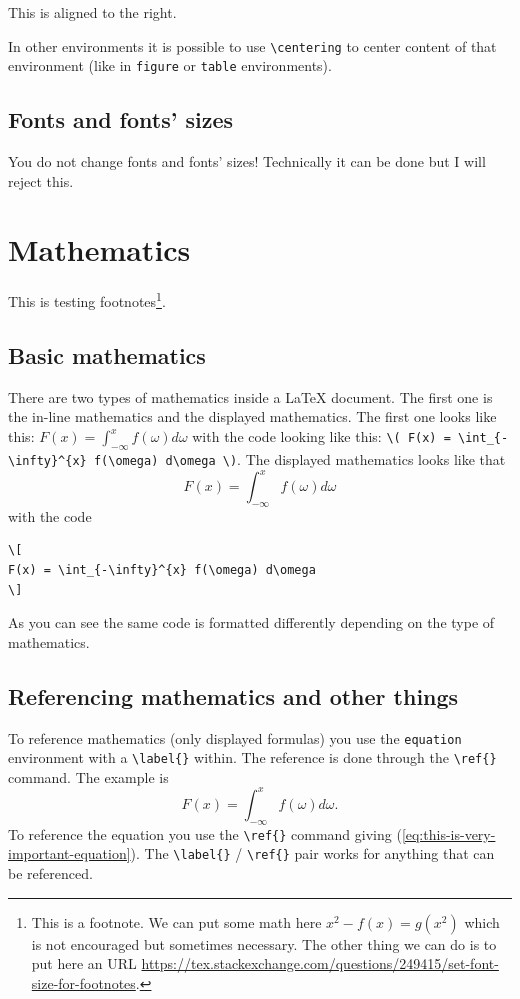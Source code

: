 \documentclass[english, twoside, 12pt, a4paper]{article}
\theoremstyle{definition}
\theoremstyle{plain}
\theoremstyle{remark}
\begin{document}
\begin{flushright}
  This is aligned to the right. 
\end{flushright}

In other environments it is possible to use \verb+\centering+ to center content of that environment (like in \verb+figure+ or \verb+table+ environments).

\subsection{Fonts and fonts' sizes}

You do not change fonts and fonts' sizes! Technically it can be done but I will reject this.

\clearpage
\section{Mathematics}

This is testing footnotes\footnote{This is a footnote. We can put some math here \( x^2 - f(x) = g(x^2) \) which is not encouraged but sometimes necessary. The other thing we can do is to put here an URL \url{https://tex.stackexchange.com/questions/249415/set-font-size-for-footnotes}. }.

\subsection{Basic mathematics}

There are two types of mathematics inside a \LaTeX{} document. The first one is the in-line mathematics and the displayed mathematics. The first one looks like this: \( F(x) = \int_{-\infty}^{x} f(\omega) d\omega \) with the code looking like this: \verb!\( F(x) = \int_{-\infty}^{x} f(\omega) d\omega \)!. The displayed mathematics looks like that
\[
F(x) = \int_{-\infty}^{x} f(\omega) d\omega
\]
with the code
\begin{verbatim}
\[
F(x) = \int_{-\infty}^{x} f(\omega) d\omega
\]
\end{verbatim}
As you can see the same code is formatted differently depending on the type of mathematics.

\subsection{Referencing mathematics and other things}

To reference mathematics (only displayed formulas) you use the \verb+equation+ environment with a \verb+\label{}+ within. The reference is done through the \verb+\ref{}+ command. The example is
\begin{equation}
\label{eq:this-is-very-important-equation}
F(x) = \int_{-\infty}^{x} f(\omega) d\omega.
\end{equation}
To reference the equation you use the \verb+\ref{}+ command giving (\ref{eq:this-is-very-important-equation}). The \verb+\label{}+ / \verb+\ref{}+ pair works for anything that can be referenced.
\end{document}
